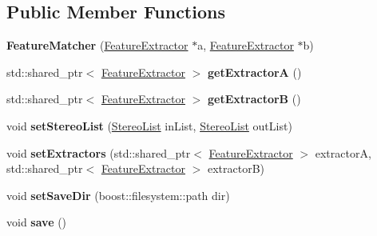 \subsection*{Public Member Functions}
\begin{DoxyCompactItemize}
\item 
{\bfseries Feature\+Matcher} (\hyperlink{classFeatureExtractor}{Feature\+Extractor} $\ast$a, \hyperlink{classFeatureExtractor}{Feature\+Extractor} $\ast$b)\hypertarget{classFeatureMatcher_a4ed4522a8ea2a0abfb4089ade947143a}{}\label{classFeatureMatcher_a4ed4522a8ea2a0abfb4089ade947143a}

\item 
std\+::shared\+\_\+ptr$<$ \hyperlink{classFeatureExtractor}{Feature\+Extractor} $>$ {\bfseries get\+ExtractorA} ()\hypertarget{classFeatureMatcher_a82d67143f4902c670faeafe6e2d07a2b}{}\label{classFeatureMatcher_a82d67143f4902c670faeafe6e2d07a2b}

\item 
std\+::shared\+\_\+ptr$<$ \hyperlink{classFeatureExtractor}{Feature\+Extractor} $>$ {\bfseries get\+ExtractorB} ()\hypertarget{classFeatureMatcher_a110a03a18df2c9b2c8db2b95b496d8ce}{}\label{classFeatureMatcher_a110a03a18df2c9b2c8db2b95b496d8ce}

\item 
void {\bfseries set\+Stereo\+List} (\hyperlink{classStereoList}{Stereo\+List} in\+List, \hyperlink{classStereoList}{Stereo\+List} out\+List)\hypertarget{classFeatureMatcher_a926e27d29ed7d9a3af6e2a056e28e24f}{}\label{classFeatureMatcher_a926e27d29ed7d9a3af6e2a056e28e24f}

\item 
void {\bfseries set\+Extractors} (std\+::shared\+\_\+ptr$<$ \hyperlink{classFeatureExtractor}{Feature\+Extractor} $>$ extractorA, std\+::shared\+\_\+ptr$<$ \hyperlink{classFeatureExtractor}{Feature\+Extractor} $>$ extractorB)\hypertarget{classFeatureMatcher_a667e67882a4183d024b16e14e04d39ad}{}\label{classFeatureMatcher_a667e67882a4183d024b16e14e04d39ad}

\item 
void {\bfseries set\+Save\+Dir} (boost\+::filesystem\+::path dir)\hypertarget{classFeatureMatcher_a7f3a131bc9fe33ca73afe8666bad9084}{}\label{classFeatureMatcher_a7f3a131bc9fe33ca73afe8666bad9084}

\item 
void {\bfseries save} ()\hypertarget{classFeatureMatcher_a4429195ec81c1a15e4cb606f8cd9efa2}{}\label{classFeatureMatcher_a4429195ec81c1a15e4cb606f8cd9efa2}

\end{DoxyCompactItemize}
